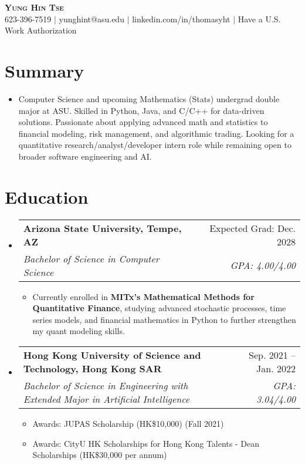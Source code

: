 \documentclass[letterpaper,11pt]{article}
\makeatletter
\newcommand{\resumeItem}[1]{
  \item\small{#1 \vspace{-2pt}}
}
\newcommand{\resumeSubheading}[4]{
  \vspace{-2pt}\item
    \begin{tabular*}{0.97\textwidth}[t]{l@{\extracolsep{\fill}}r}
      \textbf{#1} & #2 \\
      \textit{\small #3} & \textit{\small #4} \\
    \end{tabular*}\vspace{-7pt}
}
\newcommand{\resumeSubHeadingListStart}{\begin{itemize}[leftmargin=0.15in, label={}]}
\newcommand{\resumeSubHeadingListEnd}{\end{itemize}}
\newcommand{\resumeItemListStart}{\begin{itemize}}
\newcommand{\resumeItemListEnd}{\end{itemize}\vspace{-5pt}}
\makeatother
\begin{document}
\begin{center}
    \textbf{\Huge \scshape Yung Hin Tse} \\ \vspace{1pt}
    \small 623-396-7519 $|$ 
   {\small{yunghint@asu.edu}} $|$ 
   {\small{linkedin.com/in/thomasyht}} $|$ 
   {\small{Have a U.S. Work Authorization}}
\end{center}

\section*{Summary}
\begin{itemize}[leftmargin=*, label={}]
    \item Computer Science and upcoming Mathematics (Stats) undergrad double major at ASU. Skilled in Python, Java, and C/C++ for data-driven solutions. Passionate about applying advanced math and statistics to financial modeling, risk management, and algorithmic trading. Looking for a quantitative research/analyst/developer intern role while remaining open to broader software engineering and AI.
\end{itemize}

\section{Education}
\resumeSubHeadingListStart
    \resumeSubheading
      {Arizona State University, Tempe, AZ}{Expected Grad: Dec. 2028}
      {Bachelor of Science in Computer Science}{GPA: 4.00/4.00} 
    \resumeItemListStart
      \resumeItem{Currently enrolled in \textbf{MITx’s Mathematical Methods for Quantitative Finance}, studying advanced stochastic processes, time series models, and financial mathematics in Python to further strengthen my quant modeling skills.}
    \resumeItemListEnd      
    \resumeSubheading
      {Hong Kong University of Science and Technology, Hong Kong SAR}{Sep. 2021 -- Jan. 2022}
      {Bachelor of Science in Engineering with Extended Major in Artificial Intelligence}{GPA: 3.04/4.00}
    \resumeItemListStart
        \resumeItem{Awards: JUPAS Scholarship (HK\$10,000) (Fall 2021)}
        \resumeItem{Awards: CityU HK Scholarships for Hong Kong Talents - Dean Scholarships (HK\$30,000 per annum)}
    \resumeItemListEnd
\resumeSubHeadingListEnd

\end{document}
